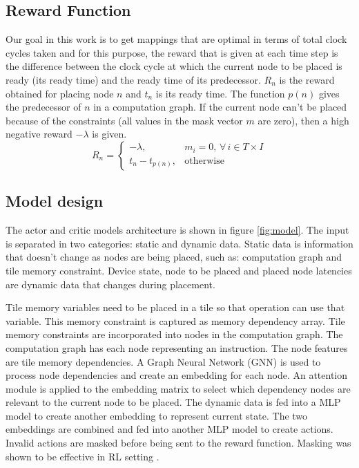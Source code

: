 \subsection{Reward Function}
Our goal in this work is to get mappings that are optimal in terms of total clock cycles taken and for this purpose, the reward that is given at each time step is the difference between the clock cycle at which the current node to be placed is ready (its ready time) and the ready time of its predecessor. $R_n$ is the reward obtained for placing node $n$ and $t_n$ is its ready time. The function $p(n)$ gives the predecessor of $n$ in a computation graph. If the current node can't be placed because of the constraints (all values in the mask vector $m$ are zero), then a high negative reward $-\lambda$ is given.
\[
  R_n =
  \begin{cases}
    -\lambda,& m_i = 0, \, \forall \, i \in T \times I \\
    t_n - t_{p(n)}, & \text{otherwise}
    
  \end{cases}
\]

\subsection{Model design}

The actor and critic models architecture is shown in figure \ref{fig:model}. 
The input is separated in two categories: static and dynamic data. 
Static data is information that doesn't change as nodes are being placed, such as: computation graph and tile memory constraint.
Device state, node to be placed and placed node latencies are dynamic data that changes during placement.

Tile memory variables need to be placed in a tile so that operation can use that variable. 
This memory constraint is captured as memory dependency array. 
Tile memory constraints are incorporated into nodes in the computation graph. 
The computation graph has each node representing an instruction. 
The node features are tile memory dependencies. 
A Graph Neural Network (GNN) is used to process node dependencies and create an embedding for each node. 
An attention module is applied to the embedding matrix to select which dependency nodes are relevant to the current node to be placed. The dynamic data is fed into a MLP model to 
create another embedding to represent current state. 
The two embeddings are combined and fed into another MLP model to 
create actions. 
Invalid actions are masked before being sent to the reward function. Masking was shown to be effective in RL setting \cite{Shengyi_mask}.


